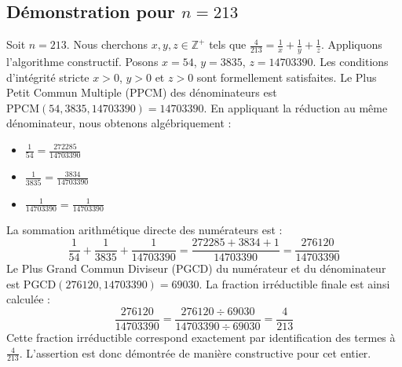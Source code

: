 \documentclass[11pt,a4paper]{article}
\begin{document}
\subsection{Démonstration pour $n = 213$}
Soit $n = 213$. Nous cherchons $x, y, z \in \mathbb{Z}^{+}$ tels que $\frac{4}{213} = \frac{1}{x} + \frac{1}{y} + \frac{1}{z}$.
Appliquons l'algorithme constructif. Posons $x = 54$, $y = 3835$, $z = 14703390$.
Les conditions d'intégrité stricte $x > 0$, $y > 0$ et $z > 0$ sont formellement satisfaites.
Le Plus Petit Commun Multiple (PPCM) des dénominateurs est $\text{PPCM}(54, 3835, 14703390) = 14703390$.
En appliquant la réduction au même dénominateur, nous obtenons algébriquement :
\begin{itemize}
    \item $\frac{1}{54} = \frac{272285}{14703390}$
    \item $\frac{1}{3835} = \frac{3834}{14703390}$
    \item $\frac{1}{14703390} = \frac{1}{14703390}$
\end{itemize}
La sommation arithmétique directe des numérateurs est :
$$ \frac{1}{54} + \frac{1}{3835} + \frac{1}{14703390} = \frac{272285 + 3834 + 1}{14703390} = \frac{276120}{14703390} $$
Le Plus Grand Commun Diviseur (PGCD) du numérateur et du dénominateur est $\text{PGCD}(276120, 14703390) = 69030$.
La fraction irréductible finale est ainsi calculée :
$$ \frac{276120}{14703390} = \frac{276120 \div 69030}{14703390 \div 69030} = \frac{4}{213} $$
Cette fraction irréductible correspond exactement par identification des termes à $\frac{4}{213}$. L'assertion est donc démontrée de manière constructive pour cet entier.
\end{document}
